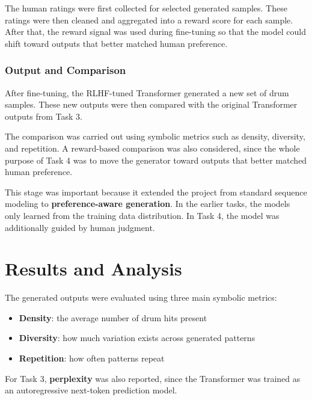 \documentclass[conference]{IEEEtran}
\begin{document}
The human ratings were first collected for selected generated samples. These ratings were then cleaned and aggregated into a reward score for each sample. After that, the reward signal was used during fine-tuning so that the model could shift toward outputs that better matched human preference.

\subsubsection{Output and Comparison}
After fine-tuning, the RLHF-tuned Transformer generated a new set of drum samples. These new outputs were then compared with the original Transformer outputs from Task 3.

The comparison was carried out using symbolic metrics such as density, diversity, and repetition. A reward-based comparison was also considered, since the whole purpose of Task 4 was to move the generator toward outputs that better matched human preference.

This stage was important because it extended the project from standard sequence modeling to \textbf{preference-aware generation}. In the earlier tasks, the models only learned from the training data distribution. In Task 4, the model was additionally guided by human judgment.

\section{Results and Analysis}
The generated outputs were evaluated using three main symbolic metrics:
\begin{itemize}
    \item \textbf{Density}: the average number of drum hits present
    \item \textbf{Diversity}: how much variation exists across generated patterns
    \item \textbf{Repetition}: how often patterns repeat
\end{itemize}
For Task 3, \textbf{perplexity} was also reported, since the Transformer was trained as an autoregressive next-token prediction model.
\end{document}
